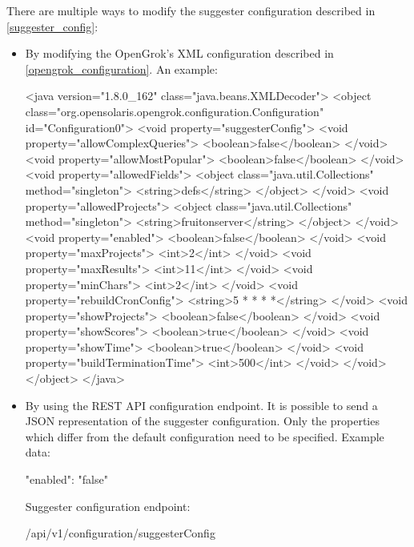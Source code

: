 There are multiple ways to modify the suggester configuration described in \ref{suggester_config}:
\begin{itemize}
    \item By modifying the OpenGrok's XML configuration described in \ref{opengrok_configuration}. An example:
\begin{code}
<java version="1.8.0_162" class="java.beans.XMLDecoder">
  <object
      class="org.opensolaris.opengrok.configuration.Configuration"
      id="Configuration0">
    <void property="suggesterConfig">
      <void property="allowComplexQueries">
        <boolean>false</boolean>
      </void>
      <void property="allowMostPopular">
        <boolean>false</boolean>
      </void>
      <void property="allowedFields">
        <object class="java.util.Collections" method="singleton">
          <string>defs</string>
        </object>
      </void>
      <void property="allowedProjects">
        <object class="java.util.Collections" method="singleton">
          <string>fruitonserver</string>
        </object>
      </void>
      <void property="enabled">
        <boolean>false</boolean>
      </void>
      <void property="maxProjects">
        <int>2</int>
      </void>
      <void property="maxResults">
        <int>11</int>
      </void>
      <void property="minChars">
        <int>2</int>
      </void>
      <void property="rebuildCronConfig">
        <string>5 * * * *</string>
      </void>
      <void property="showProjects">
        <boolean>false</boolean>
      </void>
      <void property="showScores">
        <boolean>true</boolean>
      </void>
      <void property="showTime">
        <boolean>true</boolean>
      </void>
      <void property="buildTerminationTime">
        <int>500</int>
      </void>
    </void>
  </object>
</java>
\end{code}
    \item By using the REST API configuration endpoint. It is possible to send a JSON representation of the suggester
    configuration. Only the properties which differ from the default configuration need to be specified. Example data:
\begin{code}
{"enabled": "false"}
\end{code}
    Suggester configuration endpoint:
\begin{code}
/api/v1/configuration/suggesterConfig
\end{code}

\end{itemize}
